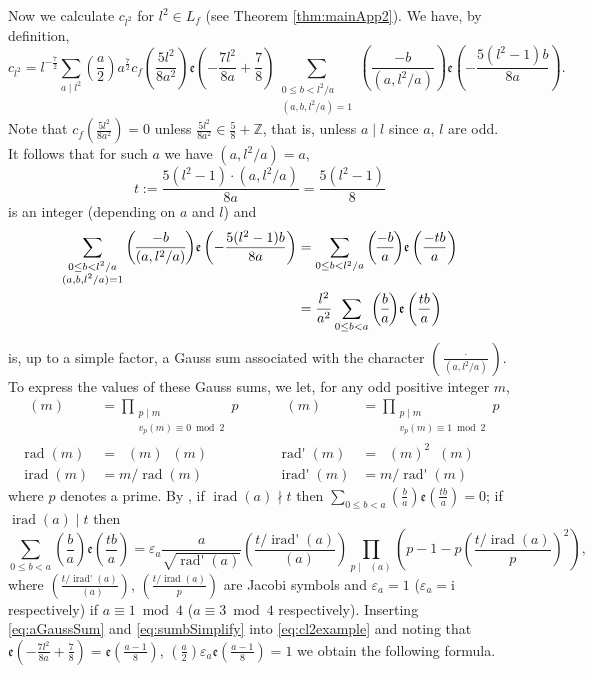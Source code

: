 \documentclass[12pt]{amsart}
\numberwithin{equation}{section}
\theoremstyle{plain}
\theoremstyle{definition}
\theoremstyle{remark}
\newcommand\twoscript[2]{\substack{{#1} \\ {#2}}}
\newcommand\rmi{\mathrm{i}}
\newcommand\legendre[2]{\genfrac{(}{)}{}{}{#1}{#2}}
\newcommand\etp[1]{\mathfrak{e}\left(#1\right)}
\newcommand\rad{\mathop{\mathrm{rad}}}
\newcommand\radE{\mathop{\mathrm{rad}_E}}
\newcommand\radO{\mathop{\mathrm{rad}_O}}
\newcommand\radp{\mathop{\mathrm{rad}'}}
\newcommand\irad{\mathop{\mathrm{irad}}}
\newcommand\iradp{\mathop{\mathrm{irad}'}}
\newcommand\numZ{\mathbb{Z}}
\begin{document}
Now we calculate $c_{l^2}$ for $l^2\in L_f$ (see Theorem \ref{thm:mainApp2}). We have, by definition,
\begin{equation}
\label{eq:cl2example}
c_{l^2}=l^{-\frac{7}{2}}\sum_{a\mid l^2}\legendre{a}{2}a^{\frac{7}{2}}c_f\left(\frac{5l^2}{8a^2}\right)\etp{-\frac{7l^2}{8a}+\frac{7}{8}}\sum_{\twoscript{0\leq b<l^2/a}{(a,b,l^2/a)=1}}\legendre{-b}{(a,l^2/a)}\etp{-\frac{5(l^2-1)b}{8a}}.
\end{equation}
Note that $c_f\left(\frac{5l^2}{8a^2}\right)=0$ unless $\frac{5l^2}{8a^2}\in\frac{5}{8}+\numZ$, that is, unless $a\mid l$ since $a,\,l$ are odd. It follows that for such $a$ we have $(a,l^2/a)=a$,
$$
t:=\frac{5(l^2-1)\cdot(a,l^2/a)}{8a}=\frac{5(l^2-1)}{8}
$$
is an integer (depending on $a$ and $l$) and
\begin{align}
\sum_{\twoscript{0\leq b<l^2/a}{(a,b,l^2/a)=1}}\legendre{-b}{(a,l^2/a)}\etp{-\frac{5(l^2-1)b}{8a}}&=\sum_{0\leq b<l^2/a}\legendre{-b}{a}\etp{\frac{-tb}{a}}\notag\\
&=\frac{l^2}{a^2}\sum_{0\leq b<a}\legendre{b}{a}\etp{\frac{tb}{a}}\label{eq:sumbSimplify}
\end{align}
is, up to a simple factor, a Gauss sum associated with the character $\legendre{\cdot}{(a,l^2/a)}$. To express the values of these Gauss sums, we let, for any odd positive integer $m$,
\begin{align*}
\radE(m) &= \prod_{\twoscript{p\mid m}{v_p(m)\equiv0\bmod{2}}}p  \qquad &\radO(m) &= \prod_{\twoscript{p\mid m}{v_p(m)\equiv1\bmod{2}}}p \\
\rad(m) &= \radE(m)\radO(m) \qquad &\radp(m) &= \radE(m)^2\radO(m) \\
\irad(m) &= m/\rad(m) \qquad &\iradp(m)&=m/\radp(m)
\end{align*}
where $p$ denotes a prime.
By \cite[Lemma 5.6]{ZZ23}, if $\irad(a)\nmid t$ then $\sum_{0\leq b<a}\legendre{b}{a}\etp{\frac{tb}{a}}=0$; if $\irad(a)\mid t$ then
\begin{equation}
\label{eq:aGaussSum}
\sum_{0\leq b<a}\legendre{b}{a}\etp{\frac{tb}{a}}
=\varepsilon_a\frac{a}{\sqrt{\radp(a)}}\legendre{t/\iradp(a)}{\radO(a)}\prod_{p \mid \radE(a)}\left(p-1-p\legendre{t/\irad(a)}{p}^2\right),
\end{equation}
where $\legendre{t/\iradp(a)}{\radO(a)}$, $\legendre{t/\irad(a)}{p}$ are Jacobi symbols and $\varepsilon_a=1$ ($\varepsilon_a=\rmi$ respectively) if $a\equiv1\bmod{4}$ ($a\equiv3\bmod{4}$ respectively). Inserting \eqref{eq:aGaussSum} and \eqref{eq:sumbSimplify} into \eqref{eq:cl2example} and noting that $\etp{-\frac{7l^2}{8a}+\frac{7}{8}}=\etp{\frac{a-1}{8}}$, $\legendre{a}{2}\varepsilon_a\etp{\frac{a-1}{8}}=1$ we obtain the following formula.
\end{document}
